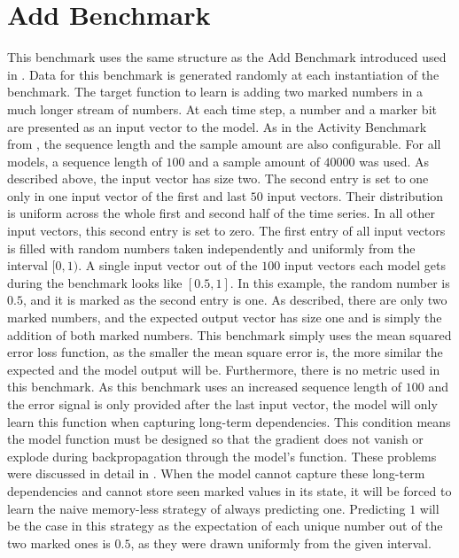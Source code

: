 \documentclass[draft,final]{vutinfth} %
\begin{document}
    \section{Add Benchmark} \label{add}
    This benchmark uses the same structure as the Add Benchmark introduced used in \cite{UnitaryRNNs}.
    Data for this benchmark is generated randomly at each instantiation of the benchmark.
    The target function to learn is adding two marked numbers in a much longer stream of numbers.
    At each time step, a number and a marker bit are presented as an input vector to the model.
    As in the Activity Benchmark from , the sequence length and the sample amount are also configurable.
    For all models, a sequence length of $100$ and a sample amount of $40000$ was used.
    As described above, the input vector has size two.
    The second entry is set to one only in one input vector of the first and last $50$ input vectors.
    Their distribution is uniform across the whole first and second half of the time series.
    In all other input vectors, this second entry is set to zero.
    The first entry of all input vectors is filled with random numbers taken independently and uniformly from the interval $[0,1)$.
    A single input vector out of the $100$ input vectors each model gets during the benchmark looks like $[0.5,1]$.
    In this example, the random number is $0.5$, and it is marked as the second entry is one.
    As described, there are only two marked numbers, and the expected output vector has size one and is simply the addition of both marked numbers.
    This benchmark simply uses the mean squared error loss function, as the smaller the mean square error is, the more similar the expected and the model output will be.
    Furthermore, there is no metric used in this benchmark.
    As this benchmark uses an increased sequence length of $100$ and the error signal is only provided after the last input vector, the model will only learn this function when capturing long-term dependencies.
    This condition means the model function must be designed so that the gradient does not vanish or explode during backpropagation through the model's function.
    These problems were discussed in detail in .
    When the model cannot capture these long-term dependencies and cannot store seen marked values in its state, it will be forced to learn the naive memory-less strategy of always predicting one.
    Predicting $1$ will be the case in this strategy as the expectation of each unique number out of the two marked ones is $0.5$, as they were drawn uniformly from the given interval.
\end{document}
